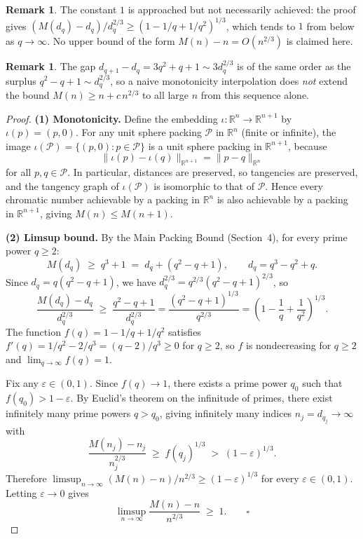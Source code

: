 \documentclass{article}
\theoremstyle{definition}
\newtheorem{remark}[theorem]{Remark}
\begin{document}
\begin{remark}
The constant $1$ is approached but not necessarily achieved: the proof gives $(M(d_q)-d_q)/d_q^{2/3} \ge (1-1/q+1/q^2)^{1/3}$, which tends to $1$ from below as $q\to\infty$.  No upper bound of the form $M(n)-n = O(n^{2/3})$ is claimed here.
\end{remark}

\begin{remark}
The gap $d_{q+1}-d_q=3q^2+q+1\sim 3d_q^{2/3}$ is of the same order as the surplus $q^2-q+1\sim d_q^{2/3}$, so a naive monotonicity interpolation does \emph{not} extend the bound $M(n)\ge n+c\,n^{2/3}$ to all large $n$ from this sequence alone.
\end{remark}

\begin{proof}
\textbf{(1) Monotonicity.}
Define the embedding $\iota:\mathbb{R}^n\to\mathbb{R}^{n+1}$ by $\iota(p)=(p,0)$.  For any unit sphere packing $\mathcal{P}$ in $\mathbb{R}^n$ (finite or infinite), the image $\iota(\mathcal{P})=\{(p,0):p\in\mathcal{P}\}$ is a unit sphere packing in $\mathbb{R}^{n+1}$, because
\[
\|\iota(p)-\iota(q)\|_{\mathbb{R}^{n+1}}=\|p-q\|_{\mathbb{R}^n}
\]
for all $p,q\in\mathcal{P}$.  In particular, distances are preserved, so tangencies are preserved, and the tangency graph of $\iota(\mathcal{P})$ is isomorphic to that of $\mathcal{P}$.  Hence every chromatic number achievable by a packing in $\mathbb{R}^n$ is also achievable by a packing in $\mathbb{R}^{n+1}$, giving $M(n)\le M(n+1)$.

\textbf{(2) Limsup bound.}
By the Main Packing Bound (Section~4), for every prime power $q\ge 2$:
\[
M(d_q)\;\ge\; q^3+1 \;=\; d_q + (q^2-q+1),\qquad d_q=q^3-q^2+q.
\]
Since $d_q=q(q^2-q+1)$, we have $d_q^{2/3}=q^{2/3}(q^2-q+1)^{2/3}$, so
\[
\frac{M(d_q)-d_q}{d_q^{2/3}}\;\ge\;\frac{q^2-q+1}{d_q^{2/3}}=\frac{(q^2-q+1)^{1/3}}{q^{2/3}}=\left(1-\frac{1}{q}+\frac{1}{q^2}\right)^{1/3}.
\]
The function $f(q)=1-1/q+1/q^2$ satisfies $f'(q)=1/q^2-2/q^3=(q-2)/q^3\ge 0$ for $q\ge 2$, so $f$ is nondecreasing for $q\ge 2$ and $\lim_{q\to\infty}f(q)=1$.

Fix any $\varepsilon\in(0,1)$.  Since $f(q)\to 1$, there exists a prime power $q_0$ such that $f(q_0)>1-\varepsilon$.  By Euclid's theorem on the infinitude of primes, there exist infinitely many prime powers $q>q_0$, giving infinitely many indices $n_j=d_{q_j}\to\infty$ with
\[
\frac{M(n_j)-n_j}{n_j^{2/3}}\;\ge\;f(q_j)^{1/3}\;>\;(1-\varepsilon)^{1/3}.
\]
Therefore $\limsup_{n\to\infty}(M(n)-n)/n^{2/3}\ge (1-\varepsilon)^{1/3}$ for every $\varepsilon\in(0,1)$.  Letting $\varepsilon\to 0$ gives
\[
\limsup_{n\to\infty}\frac{M(n)-n}{n^{2/3}}\;\ge\;1.\qquad\square
\]
\end{proof}
\end{document}
